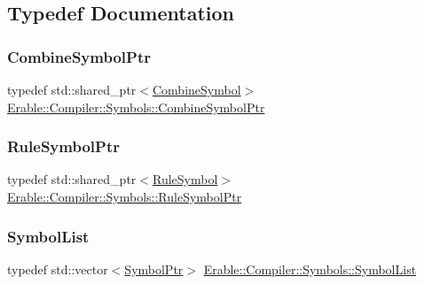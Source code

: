 \subsection{Typedef Documentation}
\mbox{\label{namespace_erable_1_1_compiler_1_1_symbols_ad3326e636860b0452468de51ed673c8a}} 
\subsubsection{\texorpdfstring{CombineSymbolPtr}{CombineSymbolPtr}}
{\footnotesize\ttfamily typedef std\+::shared\+\_\+ptr$<$\mbox{\hyperlink{struct_erable_1_1_compiler_1_1_symbols_1_1_combine_symbol}{Combine\+Symbol}}$>$ \mbox{\hyperlink{namespace_erable_1_1_compiler_1_1_symbols_ad3326e636860b0452468de51ed673c8a}{Erable\+::\+Compiler\+::\+Symbols\+::\+Combine\+Symbol\+Ptr}}}

\mbox{\label{namespace_erable_1_1_compiler_1_1_symbols_ad8082e934d2afbff2d9c8b1e77069e20}} 
\subsubsection{\texorpdfstring{RuleSymbolPtr}{RuleSymbolPtr}}
{\footnotesize\ttfamily typedef std\+::shared\+\_\+ptr$<$\mbox{\hyperlink{class_erable_1_1_compiler_1_1_symbols_1_1_rule_symbol}{Rule\+Symbol}}$>$ \mbox{\hyperlink{namespace_erable_1_1_compiler_1_1_symbols_ad8082e934d2afbff2d9c8b1e77069e20}{Erable\+::\+Compiler\+::\+Symbols\+::\+Rule\+Symbol\+Ptr}}}

\mbox{\label{namespace_erable_1_1_compiler_1_1_symbols_a63e8157d2f729d4689d27bacad42f8ed}} 
\subsubsection{\texorpdfstring{SymbolList}{SymbolList}}
{\footnotesize\ttfamily typedef std\+::vector$<$\mbox{\hyperlink{namespace_erable_1_1_compiler_1_1_symbols_a8f0bc762f448ea4d84e8713ab3e140b9}{Symbol\+Ptr}}$>$ \mbox{\hyperlink{namespace_erable_1_1_compiler_1_1_symbols_a63e8157d2f729d4689d27bacad42f8ed}{Erable\+::\+Compiler\+::\+Symbols\+::\+Symbol\+List}}}


